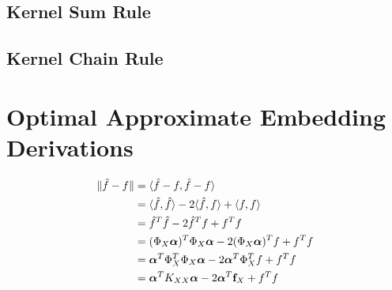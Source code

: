 \documentclass[twoside]{article} \usepackage{aistats2017}
\theoremstyle{definition}
\theoremstyle{definition}
\theoremstyle{remark}
\newcommand{\ds}[1]{{#1}}
\begin{document}
	\subsection{Kernel Sum Rule}
	
	\subsection{Kernel Chain Rule}
	
\section{Optimal Approximate Embedding Derivations}

		\begin{equation}
		\begin{aligned}
			\Vert \hat{f} - f \Vert &= \langle \hat{f} - f, \hat{f} - f \rangle \\
			&= \langle \hat{f}, \hat{f} \rangle - 2 \langle \hat{f}, f \rangle + \langle f, f \rangle \\
			&=  \hat{f}^{T} \hat{f} - 2 \hat{f}^{T} f + f^{T} f \\
			&= (\Phi_{\ds{X}} \bm{\alpha})^{T} \Phi_{\ds{X}}  \bm{\alpha} - 2 (\Phi_{\ds{X}}  \bm{\alpha})^{T} f + f^{T} f \\
			&= \bm{\alpha}^{T} \Phi_{\ds{X}} ^{T} \Phi_{\ds{X}}  \bm{\alpha} - 2 \bm{\alpha}^{T} \Phi_{\ds{X}} ^{T} f + f^{T} f \\
			&= \bm{\alpha}^{T} K_{\ds{X} \ds{X}}  \bm{\alpha} - 2 \bm{\alpha}^{T} \bvec{f}_{\ds{X}} + f^{T} f \\
			\end{aligned}
		\label{eq:approximate_embedding_derivation}
		\end{equation}
\end{document}
